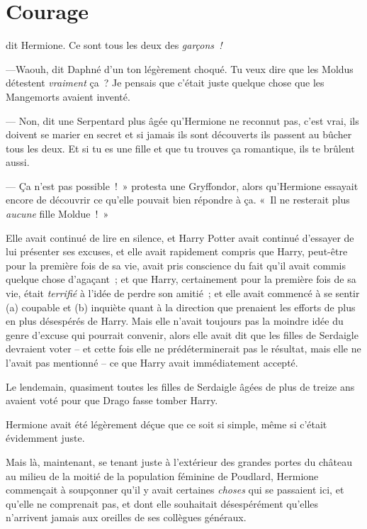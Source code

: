 \chapter{Courage}

 dit Hermione.
Ce sont tous les deux des \emph{garçons~!}

\hplettrineextrapara
---Waouh, dit Daphné d'un ton légèrement choqué.
Tu veux dire que les Moldus détestent \emph{vraiment} ça~?
Je pensais que c'était juste quelque chose que les Mangemorts avaient inventé.

--- Non, dit une Serpentard plus âgée qu'Hermione ne reconnut pas, c'est vrai, ils doivent se marier en secret et si jamais ils sont découverts ils passent au bûcher tous les deux.
Et si tu es une fille et que tu trouves ça romantique, ils te brûlent aussi.

--- Ça n'est pas possible~!~»
protesta une Gryffondor, alors qu'Hermione essayait encore de découvrir ce qu'elle pouvait bien répondre à ça.
«~Il ne resterait plus \emph{aucune} fille Moldue~!~»

Elle avait continué de lire en silence, et Harry Potter avait continué d'essayer de lui présenter ses excuses, et elle avait rapidement compris que Harry, peut-être pour la première fois de sa vie, avait pris conscience du fait qu'il avait commis quelque chose d'agaçant~; et que Harry, certainement pour la première fois de sa vie, était \emph{terrifié} à l'idée de perdre son amitié~; et elle avait commencé à se sentir (a) coupable et (b) inquiète quant à la direction que prenaient les efforts de plus en plus désespérés de Harry.
Mais elle n'avait toujours pas la moindre idée du genre d'excuse qui pourrait convenir, alors elle avait dit que les filles de Serdaigle devraient voter -- et cette fois elle ne prédéterminerait pas le résultat, mais elle ne l'avait pas mentionné -- ce que Harry avait immédiatement accepté.

Le lendemain, quasiment toutes les filles de Serdaigle âgées de plus de treize ans avaient voté pour que Drago fasse tomber Harry.

Hermione avait été légèrement déçue que ce soit si simple, même si c'était évidemment juste.

Mais là, maintenant, se tenant juste à l'extérieur des grandes portes du château au milieu de la moitié de la population féminine de Poudlard, Hermione commençait à soupçonner qu'il y avait certaines \emph{choses} qui se passaient ici, et qu'elle ne comprenait pas, et dont elle souhaitait désespérément qu'elles n'arrivent jamais aux oreilles de ses collègues généraux.

